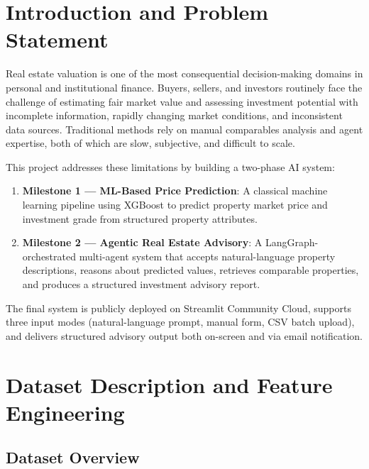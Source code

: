 \documentclass[12pt,a4paper]{article}
\begin{document}
\section{Introduction and Problem Statement}

Real estate valuation is one of the most consequential decision-making domains in personal and institutional finance. Buyers, sellers, and investors routinely face the challenge of estimating fair market value and assessing investment potential with incomplete information, rapidly changing market conditions, and inconsistent data sources. Traditional methods rely on manual comparables analysis and agent expertise, both of which are slow, subjective, and difficult to scale.

This project addresses these limitations by building a two-phase AI system:

\begin{enumerate}[leftmargin=1.5em]
  \item \textbf{Milestone 1 --- ML-Based Price Prediction}: A classical machine learning pipeline using XGBoost to predict property market price and investment grade from structured property attributes.
  \item \textbf{Milestone 2 --- Agentic Real Estate Advisory}: A LangGraph-orchestrated multi-agent system that accepts natural-language property descriptions, reasons about predicted values, retrieves comparable properties, and produces a structured investment advisory report.
\end{enumerate}

The final system is publicly deployed on Streamlit Community Cloud, supports three input modes (natural-language prompt, manual form, CSV batch upload), and delivers structured advisory output both on-screen and via email notification.

\section{Dataset Description and Feature Engineering}

\subsection{Dataset Overview}
\end{document}
